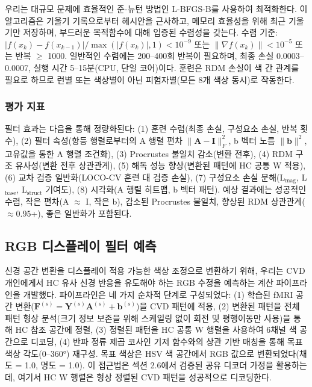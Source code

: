 \documentclass[12pt,a4paper]{article}
\begin{document}
우리는 대규모 문제에 효율적인 준-뉴턴 방법인 L-BFGS-B를 사용하여 최적화한다. 이 알고리즘은 기울기 기록으로부터 헤시안을 근사하고, 메모리 효율성을 위해 최근 기울기만 저장하며, 부드러운 목적함수에 대해 입증된 수렴성을 갖는다. 수렴 기준: $|f(x_k) - f(x_{k-1})| / \max(|f(x_k)|, 1) < 10^{-9}$ 또는 $\|\nabla f(x_k)\| < 10^{-5}$ 또는 반복 $\geq$ 1000. 일반적인 수렴에는 200--400회 반복이 필요하며, 최종 손실 0.0003--0.0007, 실행 시간 5--15분(CPU, 단일 코어)이다. 훈련은 RDM 손실이 색 간 관계를 필요로 하므로 런별 또는 색상별이 아닌 피험자별(모든 8개 색상 동시)로 작동한다.

\subsubsection{평가 지표}

필터 효과는 다음을 통해 정량화된다: (1) 훈련 수렴(최종 손실, 구성요소 손실, 반복 횟수), (2) 필터 속성(항등 행렬로부터의 A 행렬 편차 $\|\mathbf{A} - \mathbf{I}\|_F^2$, b 벡터 노름 $\|\mathbf{b}\|^2$, 고유값을 통한 A 행렬 조건화), (3) Procrustes 불일치 감소(변환 전후), (4) RDM 구조 유사성(변환 전후 상관관계), (5) 해독 성능 향상(변환된 패턴에 HC 공통 W 적용), (6) 교차 검증 일반화(LOCO-CV 훈련 대 검증 손실), (7) 구성요소 손실 분해(L$_{\text{mag}}$, L$_{\text{base}}$, L$_{\text{struct}}$ 기여도), (8) 시각화(A 행렬 히트맵, b 벡터 패턴). 예상 결과에는 성공적인 수렴, 작은 편차(A $\approx$ I, 작은 b), 감소된 Procrustes 불일치, 향상된 RDM 상관관계($\approx$0.95+), 좋은 일반화가 포함된다.

\subsection{RGB 디스플레이 필터 예측}

신경 공간 변환을 디스플레이 적용 가능한 색상 조정으로 변환하기 위해, 우리는 CVD 개인에게서 HC 유사 신경 반응을 유도해야 하는 RGB 수정을 예측하는 계산 파이프라인을 개발했다. 파이프라인은 네 가지 순차적 단계로 구성되었다: (1) 학습된 fMRI 공간 변환($\mathbf{F}^{(s)} = \mathbf{Y}^{(s)} \mathbf{A}^{(s)} + \mathbf{b}^{(s)}$)을 CVD 패턴에 적용, (2) 변환된 패턴을 전체 패턴 형상 분석(크기 정보 보존을 위해 스케일링 없이 회전 및 평행이동만 사용)을 통해 HC 참조 공간에 정렬, (3) 정렬된 패턴을 HC 공통 W 행렬을 사용하여 6채널 색 공간으로 디코딩, (4) 반파 정류 제곱 코사인 기저 함수와의 상관 기반 매칭을 통해 목표 색상 각도(0--360°) 재구성. 목표 색상은 HSV 색 공간에서 RGB 값으로 변환되었다(채도 = 1.0, 명도 = 1.0). 이 접근법은 섹션 2.6에서 검증된 공유 디코더 가정을 활용하는데, 여기서 HC W 행렬은 형상 정렬된 CVD 패턴을 성공적으로 디코딩한다.
\end{document}
